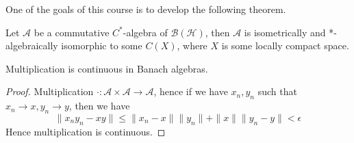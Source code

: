 One of the goals of this course is to develop the following theorem.
\begin{theorem}
    Let $\mathcal{A}$ be a commutative $C^*$-algebra of $\mathcal{B}(\mathcal{H})$, then $\mathcal{A}$ is isometrically and *-algebraically isomorphic to some $C(X)$, where $X$ is some locally compact space.
\end{theorem}


\begin{proposition}
    Multiplication is continuous in Banach algebras.
\end{proposition}
\begin{proof}
    Multiplication $\cdot: \mathcal{A}\times\mathcal{A}\to\mathcal{A}$, hence if we have $x_n, y_n$ such that $x_n\to x, y_n\to y$, then we have
    \begin{equation*}
        \|x_ny_n-xy\|\leq\|x_n-x\|\|y_n\|+\|x\|\|y_n-y\|<\epsilon
    \end{equation*}
    Hence multiplication is continuous.
\end{proof}

